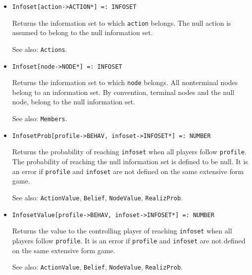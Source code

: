 \begin{itemize}
\item{}
\protect \large \begin{verbatim}
Infoset[action->ACTION*] =: INFOSET 
\end{verbatim} \normalsize

\bd
Returns the information set to which \verb+action+ belongs.  The null
action is assumed to belong to the null information set.
\item [See also:] \verb+Actions+.
\ed

\item{}
\protect \large \begin{verbatim}
Infoset[node->NODE*] =: INFOSET 
\end{verbatim}\normalsize

\bd
Returns the information set to which \verb+node+ belongs.  All
nonterminal nodes belong to an information set.  By convention,
terminal nodes and the null node, belong to the null information set.
\item [See also:] \verb+Members+.
\ed

\item{}
\protect \large \begin{verbatim}
InfosetProb[profile->BEHAV, infoset->INFOSET*] =: NUMBER 
\end{verbatim}\normalsize

\bd
Returns the probability of reaching \verb+infoset+ when all players
follow \verb+profile+.  The probability of reaching the null information
set is defined to be null.  It is an error if \verb+profile+ and
\verb+infoset+ are not defined on the same extensive form game.
\item
[See also:] \verb+ActionValue+, \verb+Belief+, \verb+NodeValue+,
\verb+RealizProb+.
\ed

\item{}
\protect \large \begin{verbatim}
InfosetValue[profile->BEHAV, infoset->INFOSET*] =: NUMBER 
\end{verbatim}\normalsize

\bd

Returns the value to the controlling player of reaching \verb+infoset+
when all players follow \verb+profile+.  It is an error if
\verb+profile+ and \verb+infoset+ are not defined on the same
extensive form game.

\item
[See also:] \verb+ActionValue+, \verb+Belief+, \verb+NodeValue+,
\verb+RealizProb+.
\ed


\end{itemize}

